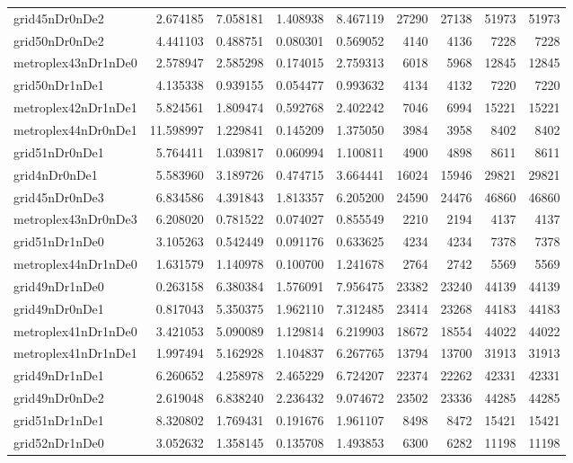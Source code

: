 \begin{longtable}{|l|r|r|r|r|r|r|r|r|}
grid45nDr0nDe2 & 2.674185 & 7.058181 & 1.408938 & 8.467119 & 27290 & 27138 & 51973 & 51973 \\
grid50nDr0nDe2 & 4.441103 & 0.488751 & 0.080301 & 0.569052 & 4140 & 4136 & 7228 & 7228 \\
metroplex43nDr1nDe0 & 2.578947 & 2.585298 & 0.174015 & 2.759313 & 6018 & 5968 & 12845 & 12845 \\
grid50nDr1nDe1 & 4.135338 & 0.939155 & 0.054477 & 0.993632 & 4134 & 4132 & 7220 & 7220 \\
metroplex42nDr1nDe1 & 5.824561 & 1.809474 & 0.592768 & 2.402242 & 7046 & 6994 & 15221 & 15221 \\
metroplex44nDr0nDe1 & 11.598997 & 1.229841 & 0.145209 & 1.375050 & 3984 & 3958 & 8402 & 8402 \\
grid51nDr0nDe1 & 5.764411 & 1.039817 & 0.060994 & 1.100811 & 4900 & 4898 & 8611 & 8611 \\
grid4nDr0nDe1 & 5.583960 & 3.189726 & 0.474715 & 3.664441 & 16024 & 15946 & 29821 & 29821 \\
grid45nDr0nDe3 & 6.834586 & 4.391843 & 1.813357 & 6.205200 & 24590 & 24476 & 46860 & 46860 \\
metroplex43nDr0nDe3 & 6.208020 & 0.781522 & 0.074027 & 0.855549 & 2210 & 2194 & 4137 & 4137 \\
grid51nDr1nDe0 & 3.105263 & 0.542449 & 0.091176 & 0.633625 & 4234 & 4234 & 7378 & 7378 \\
metroplex44nDr1nDe0 & 1.631579 & 1.140978 & 0.100700 & 1.241678 & 2764 & 2742 & 5569 & 5569 \\
grid49nDr1nDe0 & 0.263158 & 6.380384 & 1.576091 & 7.956475 & 23382 & 23240 & 44139 & 44139 \\
grid49nDr0nDe1 & 0.817043 & 5.350375 & 1.962110 & 7.312485 & 23414 & 23268 & 44183 & 44183 \\
metroplex41nDr1nDe0 & 3.421053 & 5.090089 & 1.129814 & 6.219903 & 18672 & 18554 & 44022 & 44022 \\
metroplex41nDr1nDe1 & 1.997494 & 5.162928 & 1.104837 & 6.267765 & 13794 & 13700 & 31913 & 31913 \\
grid49nDr1nDe1 & 6.260652 & 4.258978 & 2.465229 & 6.724207 & 22374 & 22262 & 42331 & 42331 \\
grid49nDr0nDe2 & 2.619048 & 6.838240 & 2.236432 & 9.074672 & 23502 & 23336 & 44285 & 44285 \\
grid51nDr1nDe1 & 8.320802 & 1.769431 & 0.191676 & 1.961107 & 8498 & 8472 & 15421 & 15421 \\
grid52nDr1nDe0 & 3.052632 & 1.358145 & 0.135708 & 1.493853 & 6300 & 6282 & 11198 & 11198 \\

\end{longtable}
